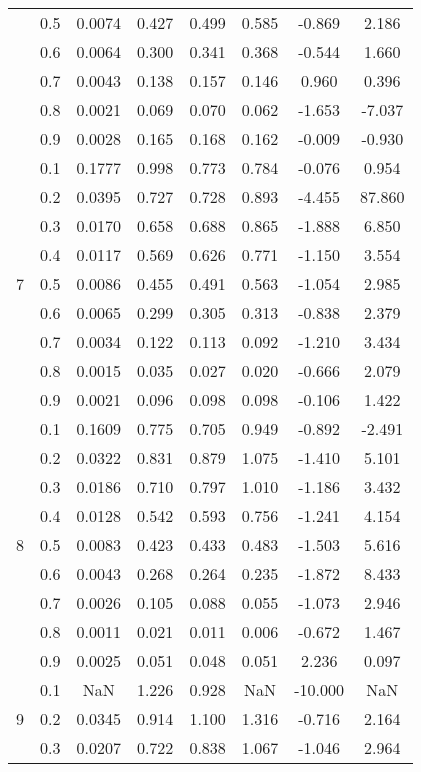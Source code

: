 \documentclass[11pt,a4paper]{report}
\begin{document}
\begin{longtable}{ | c | c || c | c | c | c | c | c | }
 & 0.5 & 0.0074 & 0.427 & 0.499 & 0.585 & -0.869 & 2.186 \\
 & 0.6 & 0.0064 & 0.300 & 0.341 & 0.368 & -0.544 & 1.660 \\
 & 0.7 & 0.0043 & 0.138 & 0.157 & 0.146 & 0.960 & 0.396 \\
 & 0.8 & 0.0021 & 0.069 & 0.070 & 0.062 & -1.653 & -7.037 \\
 & 0.9 & 0.0028 & 0.165 & 0.168 & 0.162 & -0.009 & -0.930 \\
 \hline
\multirow{9}{*}{7} & 0.1 & 0.1777 & 0.998 & 0.773 & 0.784 & -0.076 & 0.954 \\
 & 0.2 & 0.0395 & 0.727 & 0.728 & 0.893 & -4.455 & 87.860 \\
 & 0.3 & 0.0170 & 0.658 & 0.688 & 0.865 & -1.888 & 6.850 \\
 & 0.4 & 0.0117 & 0.569 & 0.626 & 0.771 & -1.150 & 3.554 \\
 & 0.5 & 0.0086 & 0.455 & 0.491 & 0.563 & -1.054 & 2.985 \\
 & 0.6 & 0.0065 & 0.299 & 0.305 & 0.313 & -0.838 & 2.379 \\
 & 0.7 & 0.0034 & 0.122 & 0.113 & 0.092 & -1.210 & 3.434 \\
 & 0.8 & 0.0015 & 0.035 & 0.027 & 0.020 & -0.666 & 2.079 \\
 & 0.9 & 0.0021 & 0.096 & 0.098 & 0.098 & -0.106 & 1.422 \\
 \hline
\multirow{9}{*}{8} & 0.1 & 0.1609 & 0.775 & 0.705 & 0.949 & -0.892 & -2.491 \\
 & 0.2 & 0.0322 & 0.831 & 0.879 & 1.075 & -1.410 & 5.101 \\
 & 0.3 & 0.0186 & 0.710 & 0.797 & 1.010 & -1.186 & 3.432 \\
 & 0.4 & 0.0128 & 0.542 & 0.593 & 0.756 & -1.241 & 4.154 \\
 & 0.5 & 0.0083 & 0.423 & 0.433 & 0.483 & -1.503 & 5.616 \\
 & 0.6 & 0.0043 & 0.268 & 0.264 & 0.235 & -1.872 & 8.433 \\
 & 0.7 & 0.0026 & 0.105 & 0.088 & 0.055 & -1.073 & 2.946 \\
 & 0.8 & 0.0011 & 0.021 & 0.011 & 0.006 & -0.672 & 1.467 \\
 & 0.9 & 0.0025 & 0.051 & 0.048 & 0.051 & 2.236 & 0.097 \\
 \hline
\multirow{9}{*}{9} & 0.1 & NaN & 1.226 & 0.928 & NaN & -10.000 & NaN \\
 & 0.2 & 0.0345 & 0.914 & 1.100 & 1.316 & -0.716 & 2.164 \\
 & 0.3 & 0.0207 & 0.722 & 0.838 & 1.067 & -1.046 & 2.964 \\

\end{longtable}
\end{document}
